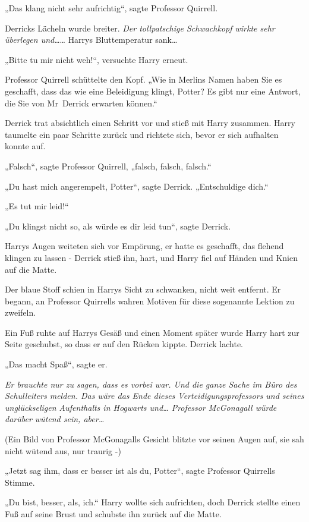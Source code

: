 {„Das klang nicht sehr aufrichtig“, sagte Professor Quirrell.

Derricks Lächeln wurde breiter. \emph{Der tollpatschige Schwachkopf wirkte sehr überlegen und}…… Harrys Bluttemperatur sank…

„Bitte tu mir nicht weh!“, versuchte Harry erneut.

Professor Quirrell schüttelte den Kopf. „Wie in Merlins Namen haben Sie es geschafft, dass das wie eine Beleidigung klingt, Potter? Es gibt nur eine Antwort, die Sie von Mr~Derrick erwarten können.“

Derrick trat absichtlich einen Schritt vor und stieß mit Harry zusammen. Harry taumelte ein paar Schritte zurück und richtete sich, bevor er sich aufhalten konnte auf.

„Falsch“, sagte Professor Quirrell, „falsch, falsch, falsch.“

„Du hast mich angerempelt, Potter“, sagte Derrick. „Entschuldige dich.“

„Es tut mir leid!“

„Du klingst nicht so, als würde es dir leid tun“, sagte Derrick.

Harrys Augen weiteten sich vor Empörung, er hatte es geschafft, das flehend klingen zu lassen - Derrick stieß ihn, hart, und Harry fiel auf Händen und Knien auf die Matte.

Der blaue Stoff schien in Harrys Sicht zu schwanken, nicht weit entfernt. Er begann, an Professor Quirrells wahren Motiven für diese sogenannte Lektion zu zweifeln.

Ein Fuß ruhte auf Harrys Gesäß und einen Moment später wurde Harry hart zur Seite geschubst, so dass er auf den Rücken kippte. Derrick lachte.

„Das macht Spaß“, sagte er.

\emph{Er brauchte nur zu sagen, dass es vorbei war. Und die ganze Sache im Büro des Schulleiters melden. Das wäre das Ende dieses Verteidigungsprofessors und seines unglückseligen Aufenthalts in Hogwarts und… Professor McGonagall würde darüber wütend sein, aber…}

(Ein Bild von Professor McGonagalls Gesicht blitzte vor seinen Augen auf, sie sah nicht wütend aus, nur traurig -)

„Jetzt sag ihm, dass er besser ist als du, Potter“, sagte Professor Quirrells Stimme.

„Du bist, besser, als, ich.“ Harry wollte sich aufrichten, doch Derrick stellte einen Fuß auf seine Brust und schubste ihn zurück auf die Matte.

}
